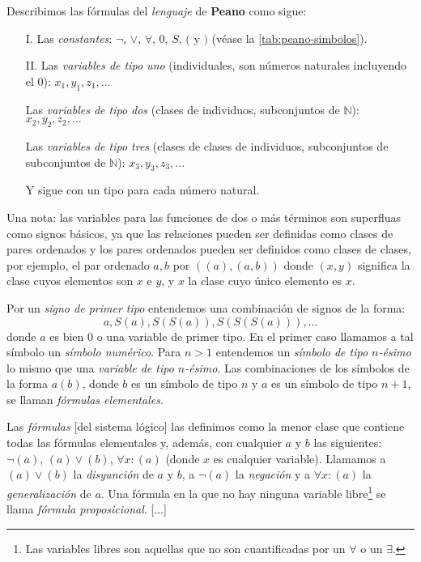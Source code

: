 \begin{sistemalogico}\label{sl:peano}
Describimos las fórmulas del \emph{lenguaje} de \textbf{Peano} como sigue:

\begin{itemize}
    \item[I.] Las \emph{constantes}: $\neg$, $\vee$, $\forall$, $0$, $S$, $($ y $)$ (véase la \cref{tab:peano-simbolos}).
    \item[II.] Las \emph{variables de tipo uno} (individuales, son números naturales incluyendo el $0$): $x_1, y_1, z_1, ...$
    
    Las \emph{variables de tipo dos} (clases de individuos, subconjuntos de $\mathbb{N}$): $x_2, y_2, z_2, ...$

    Las \emph{variables de tipo tres} (clases de clases de individuos, subconjuntos de subconjuntos de $\mathbb{N}$): $x_3, y_3, z_3, ...$

    Y sigue con un tipo para cada número natural.
\end{itemize}

Una nota: las variables para las funciones de dos o más términos son superfluas como signos básicos, ya que las relaciones pueden ser definidas como clases de pares ordenados y los pares ordenados pueden ser definidos como clases de clases, por ejemplo, el par ordenado $a,b$ por $((a), (a,b))$ donde $(x,y)$ significa la clase cuyos elementos son $x$ e $y$, y $x$ la clase cuyo único elemento es $x$.

Por un \emph{signo de primer tipo} entendemos una combinación de signos de la forma:$$a, S(a), S(S(a)), S(S(S(a))), ...$$
donde $a$ es bien $0$ o una variable de primer tipo. En el primer caso llamamos a tal símbolo un \emph{símbolo numérico}. Para $n>1$ entendemos un \emph{símbolo de tipo $n$-ésimo} lo mismo que una \emph{variable de tipo $n$-ésimo}. Las combinaciones de los símbolos de la forma $a(b)$, donde $b$ es un símbolo de tipo $n$ y $a$ es un símbolo de tipo $n+1$, se llaman \emph{fórmulas elementales}.

Las \emph{fórmulas} [del sistema lógico] las definimos como la menor clase que contiene todas las fórmulas elementales y, además, con cualquier $a$ y $b$ las siguientes: $\neg (a)$, $(a) \vee (b)$, $\forall x : (a)$ (donde $x$ es cualquier variable). Llamamos a $(a)\vee(b)$ la \emph{disyunción} de $a$ y $b$, a $\neg(a)$ la \emph{negación} y a $\forall x : (a)$ la \emph{generalización} de $a$. Una fórmula en la que no hay ninguna variable libre\footnote{Las variables libres son aquellas que no son cuantificadas por un $\forall$ o un $\exists$.} se llama \emph{fórmula proposicional}. [...]


\end{sistemalogico}
